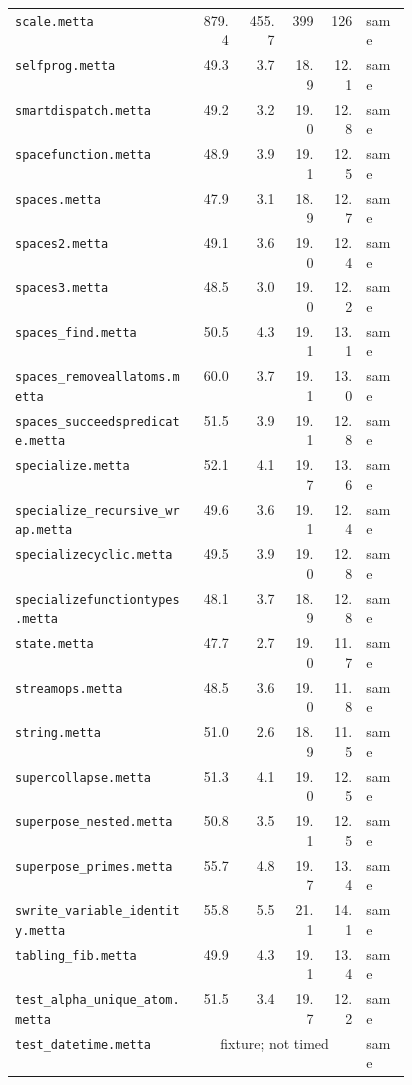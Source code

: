 \begin{longtable}{@{}p{0.46\linewidth}rrrrl@{}}
\nolinkurl{scale.metta} & 879.4 & 455.7 & 399 & 126 & same \\
\nolinkurl{selfprog.metta} & 49.3 & 3.7 & 18.9 & 12.1 & same \\
\nolinkurl{smartdispatch.metta} & 49.2 & 3.2 & 19.0 & 12.8 & same \\
\nolinkurl{spacefunction.metta} & 48.9 & 3.9 & 19.1 & 12.5 & same \\
\nolinkurl{spaces.metta} & 47.9 & 3.1 & 18.9 & 12.7 & same \\
\nolinkurl{spaces2.metta} & 49.1 & 3.6 & 19.0 & 12.4 & same \\
\nolinkurl{spaces3.metta} & 48.5 & 3.0 & 19.0 & 12.2 & same \\
\nolinkurl{spaces_find.metta} & 50.5 & 4.3 & 19.1 & 13.1 & same \\
\nolinkurl{spaces_removeallatoms.metta} & 60.0 & 3.7 & 19.1 & 13.0 & same \\
\nolinkurl{spaces_succeedspredicate.metta} & 51.5 & 3.9 & 19.1 & 12.8 & same \\
\nolinkurl{specialize.metta} & 52.1 & 4.1 & 19.7 & 13.6 & same \\
\nolinkurl{specialize_recursive_wrap.metta} & 49.6 & 3.6 & 19.1 & 12.4 & same \\
\nolinkurl{specializecyclic.metta} & 49.5 & 3.9 & 19.0 & 12.8 & same \\
\nolinkurl{specializefunctiontypes.metta} & 48.1 & 3.7 & 18.9 & 12.8 & same \\
\nolinkurl{state.metta} & 47.7 & 2.7 & 19.0 & 11.7 & same \\
\nolinkurl{streamops.metta} & 48.5 & 3.6 & 19.0 & 11.8 & same \\
\nolinkurl{string.metta} & 51.0 & 2.6 & 18.9 & 11.5 & same \\
\nolinkurl{supercollapse.metta} & 51.3 & 4.1 & 19.0 & 12.5 & same \\
\nolinkurl{superpose_nested.metta} & 50.8 & 3.5 & 19.1 & 12.5 & same \\
\nolinkurl{superpose_primes.metta} & 55.7 & 4.8 & 19.7 & 13.4 & same \\
\nolinkurl{swrite_variable_identity.metta} & 55.8 & 5.5 & 21.1 & 14.1 & same \\
\nolinkurl{tabling_fib.metta} & 49.9 & 4.3 & 19.1 & 13.4 & same \\
\nolinkurl{test_alpha_unique_atom.metta} & 51.5 & 3.4 & 19.7 & 12.2 & same \\
\nolinkurl{test_datetime.metta} & \multicolumn{4}{c}{fixture; not timed} & same \\

\end{longtable}
